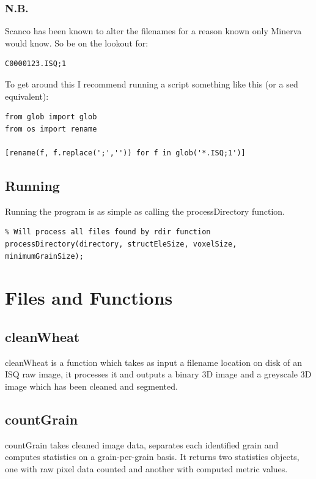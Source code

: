 \documentclass[a4paper]{article}
\begin{document}
\subsubsection{N.B.}
\label{sec:org546d1a2}

Scanco has been known to alter the filenames for a reason known only Minerva would know.
So be on the lookout for:
\begin{verbatim}
C0000123.ISQ;1
\end{verbatim}

To get around this I recommend running a script something like this (or a sed equivalent):

\begin{verbatim}
from glob import glob
from os import rename

[rename(f, f.replace(';','')) for f in glob('*.ISQ;1')]
\end{verbatim}

\subsection{Running}
\label{sec:org953f8e9}
Running the program is as simple as calling the processDirectory function.
\begin{verbatim}
% Will process all files found by rdir function
processDirectory(directory, structEleSize, voxelSize, minimumGrainSize);
\end{verbatim}

\section{Files and Functions}
\label{sec:org5b82d92}

\subsection{cleanWheat}
\label{sec:orgb59e1a1}
cleanWheat is a function which takes as input a filename location on disk of an ISQ raw image, it processes it and outputs a binary 3D image and a greyscale 3D image which has been cleaned and segmented.
\subsection{countGrain}
\label{sec:org19cec71}
countGrain takes cleaned image data, separates each identified grain and computes statistics on a grain-per-grain basis. It returns two statistics objects, one with raw pixel data counted and another with computed metric values.
\end{document}
